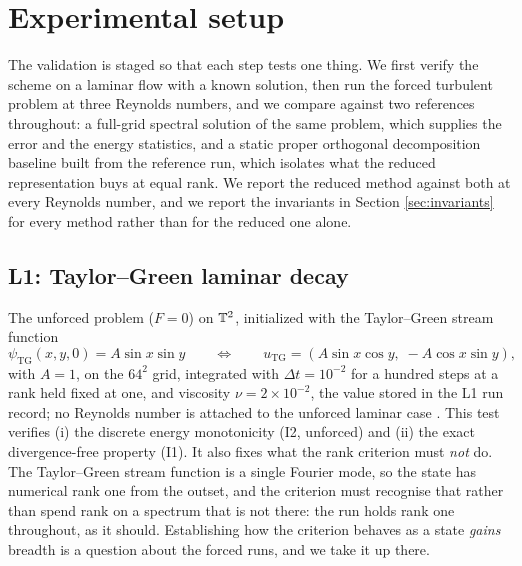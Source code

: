 
\section{Experimental setup}
\label{sec:setup}

The validation is staged so that each step tests one thing. We first verify the
scheme on a laminar flow with a known solution, then run the forced turbulent
problem at three Reynolds numbers, and we compare against two references
throughout: a full-grid spectral solution of the same problem, which supplies
the error and the energy statistics, and a static proper orthogonal
decomposition baseline built from the reference run, which isolates what the
reduced representation buys at equal rank. We report the reduced method against
both at every Reynolds number, and we report the invariants in Section
\ref{sec:invariants} for every method rather than for the reduced one alone.

\subsection{L1: Taylor--Green laminar decay}
\label{sec:taylor-green}

The unforced problem ($F = 0$) on $\mathbb{T}^2$, initialized with the Taylor--Green
stream function
\begin{equation}
  \psi_{\mathrm{TG}}(x,y,0) = A \sin x \sin y
  \qquad\Longleftrightarrow\qquad
  u_{\mathrm{TG}} = (A \sin x \cos y,\; -A \cos x \sin y),
  \label{eq:tg}
\end{equation}
with $A = 1$, on the $64^2$ grid, integrated with $\Delta t = 10^{-2}$ for a
hundred steps at a rank held fixed at one, and
viscosity $\nu = 2\times 10^{-2}$, the value stored in the L1 run record; no
Reynolds number is attached to the unforced laminar case
. This test verifies (i) the discrete energy monotonicity (I2, unforced) and
(ii) the exact divergence-free property (I1). It also fixes what the rank
criterion must \emph{not} do. The Taylor--Green stream function is a single
Fourier mode, so the state has numerical rank one from the outset, and the
criterion must recognise that rather than spend rank on a spectrum that is not
there: the run holds rank one throughout, as it should. Establishing how the
criterion behaves as a state \emph{gains} breadth is a question about the forced
runs, and we take it up there.

